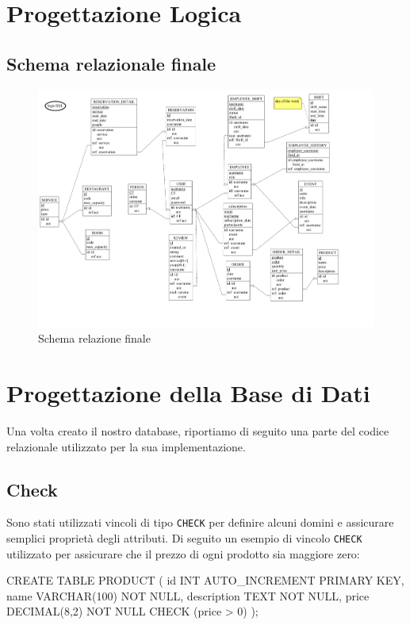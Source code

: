 \documentclass[a4paper,12pt]{report}
\begin{document}
\chapter{Progettazione Logica}

\section{Schema relazionale finale}
\begin{figure}[H]
    \centering
    \includegraphics[width=\textwidth, trim=0 0 0 0]{./schemas/logic.pdf}
    \caption{Schema relazione finale}
    \label{fig:schema-relazione}
\end{figure}
\newpage

\chapter{Progettazione della Base di Dati}
Una volta creato il nostro database, riportiamo di seguito una parte del codice relazionale 
utilizzato per la sua implementazione.

\section{Check}
Sono stati utilizzati vincoli di tipo \texttt{CHECK} per definire alcuni domini e assicurare 
semplici proprietà degli attributi. Di seguito un esempio di vincolo \texttt{CHECK} utilizzato 
per assicurare che il prezzo di ogni prodotto sia maggiore zero:
\begin{sqlcode}[caption={},label={lst:check}]
CREATE TABLE PRODUCT (
    id INT AUTO_INCREMENT PRIMARY KEY,
    name VARCHAR(100) NOT NULL,
    description TEXT NOT NULL,
    price DECIMAL(8,2) NOT NULL CHECK (price > 0)
);
\end{sqlcode}
\end{document}
